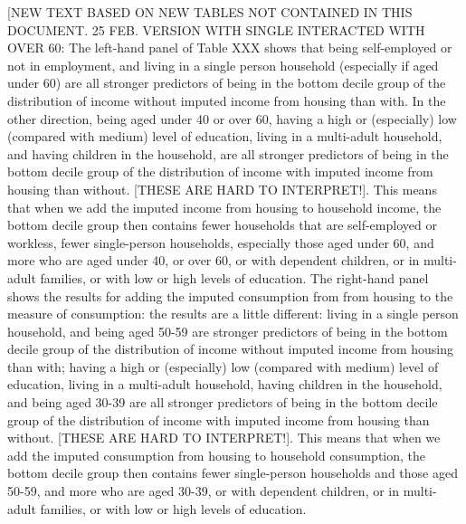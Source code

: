 [NEW TEXT BASED ON NEW TABLES NOT CONTAINED IN THIS DOCUMENT. 25 FEB.  VERSION WITH SINGLE INTERACTED WITH OVER 60: The left-hand panel of Table XXX shows that being self-employed or not in employment, and living in a single person household (especially if aged under 60) are all stronger predictors of being in the bottom decile group of the distribution of income without imputed income from housing than with.  In the other direction, being aged under 40 or over 60, having a high or (especially) low (compared with medium) level of education, living in a multi-adult household, and having children in the household, are all stronger predictors of being in the bottom decile group of the distribution of income with imputed income from housing than without. [THESE ARE HARD TO INTERPRET!]. This means that when we add the imputed income from housing to household income, the bottom decile group then contains fewer households that are self-employed or workless, fewer single-person households, especially those aged under 60, and more who are aged under 40, or over 60, or with dependent children, or in multi-adult families, or with low or high levels of education.  The right-hand panel shows the results for adding the imputed consumption from from housing to the measure of consumption: the results are a little different: living in a single person household, and being aged 50-59 are stronger predictors of being in the bottom decile group of the distribution of income without imputed income from housing than with; having a high or (especially) low (compared with medium) level of education,  living in a multi-adult household, having children in the household, and being aged 30-39 are all stronger predictors of being in the bottom decile group of the distribution of income with imputed income from housing than without. [THESE ARE HARD TO INTERPRET!]. This means that when we add the imputed consumption from housing to household consumption, the bottom decile group then contains fewer single-person households and those aged 50-59, and more who are aged 30-39, or with dependent children, or in multi-adult families, or with low or high levels of education.  

